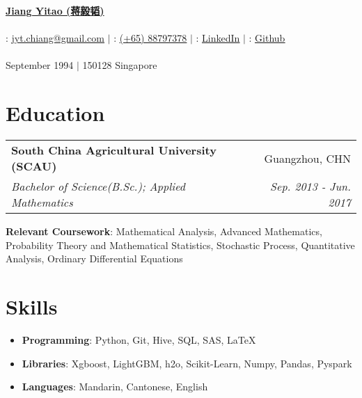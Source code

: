 \documentclass[letterpaper,10pt]{article}
\makeatletter
\newcommand{\resumeItemNoBullet}[2]{
  \item[]\small{
    \hspace{-9pt}\textbf{#1}{: #2 \vspace{-6pt}}
  }
}
\newcommand{\resumeSubheading}[4]{
  \vspace{-1pt}\item[]
  \begin{tabular*}{0.98\textwidth}{l@{\extracolsep{\fill}}r}
      \hspace{-10pt}\textbf{#1} & #2 \\
      \hspace{-10pt}\textit{\small#3} & \textit{\small #4} \\
    \end{tabular*}\vspace{-5pt}
}
\newcommand{\resumeSubHeadingListStart}{\begin{itemize}[leftmargin=*]}
\newcommand{\resumeSubHeadingListEnd}{\end{itemize}}
\newcommand{\shorterSection}[1]{\vspace{-10pt}\section{#1}}
\makeatother
\begin{document}
\begin{CJK*}{UTF8}{gkai}

\fancyfoot[C]{} 

\begin{center}
  \small \textbf{\href{chiang233.github.io}{\huge Jiang Yitao  (蒋毅韬)}} \\  
  ~\\
  \faEnvelope : \href{mailto:jyt.chiang@gmail.com}{\color{blue}\underline{jyt.chiang@gmail.com}} $\vert$
  \faPhone    : \href{tel:88797378} {\color{blue}\underline{(+65) 88797378}}                    $\vert$ 
  \faLinkedin : \href{https://www.linkedin.com/in/chiang1049/}{\color{blue}\underline{LinkedIn}} $\vert$
  \faGithub   : \href{https://github.com/Yitao1024}{\color{blue}\underline{Github}} \\
  ~\\
  \small September 1994 $\vert$ 150128 Singapore
\end{center}

\hspace*{\fill} 

\shorterSection{Education}
  \resumeSubHeadingListStart
  \vspace{5pt} 
    \resumeSubheading
      {South China Agricultural University (SCAU)}{Guangzhou, CHN}
      {Bachelor of Science(B.Sc.);  Applied Mathematics}{Sep. 2013 - Jun. 2017}{
      \resumeItemNoBullet{Relevant Coursework}{Mathematical Analysis, Advanced Mathematics, Probability Theory and Mathematical Statistics, Stochastic Process, Quantitative Analysis, Ordinary Differential Equations}
    }

  \resumeSubHeadingListEnd
  \hspace*{\fill} 

\shorterSection{Skills}
  \resumeSubHeadingListStart
  \vspace{5pt} 
  \small
    \item{
     \textbf{Programming}{: Python, Git, Hive, SQL, SAS, LaTeX}
    }
    \vspace{-5pt}
    \item{
     \textbf{Libraries}{: Xgboost, LightGBM, h2o, Scikit-Learn, Numpy, Pandas, Pyspark}
    }
    \vspace{-5pt}
    \item{
     \textbf{Languages}{: Mandarin, Cantonese, English}
    }
\resumeSubHeadingListEnd
  \hspace*{\fill} 


\end{CJK*}
\end{document}
